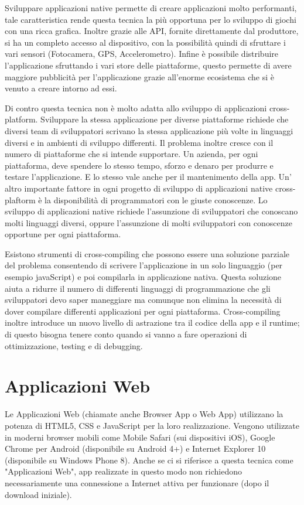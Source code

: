 Sviluppare applicazioni native permette di creare applicazioni molto performanti, tale caratteristica rende questa tecnica la più opportuna per lo sviluppo di giochi con una ricca grafica. Inoltre grazie alle API, fornite direttamente dal produttore, si ha un completo accesso al dispositivo, con la possibilità quindi di sfruttare i vari sensori (Fotocamera, GPS, Accelerometro). Infine è possibile distribuire l'applicazione sfruttando i vari store delle piattaforme, questo permette di avere maggiore pubblicità per l'applicazione grazie all'enorme ecosistema che si è venuto a creare intorno ad essi.

Di contro questa tecnica non è molto adatta allo sviluppo di applicazioni cross-platform. Sviluppare la stessa applicazione per diverse piattaforme richiede che diversi team di sviluppatori scrivano la stessa applicazione più volte in linguaggi diversi e in ambienti di sviluppo differenti.
Il problema inoltre cresce con il numero di piattaforme che si intende supportare. Un azienda, per ogni piattaforma, deve spendere lo stesso tempo, sforzo e denaro per produrre e testare l'applicazione. E lo stesso vale anche per il mantenimento della app.
Un' altro importante fattore in ogni progetto di sviluppo di applicazioni native cross-plaftorm è la disponibilità di programmatori con le giuste conoscenze. Lo sviluppo di applicazioni native richiede l'assunzione di sviluppatori che conoscano molti linguaggi diversi, oppure l'assunzione di molti sviluppatori con conoscenze opportune per ogni piattaforma.
 
Esistono strumenti di cross-compiling che possono essere una soluzione parziale del problema consentendo di scrivere l'applicazione in un solo linguaggio (per esempio javaScript) e poi compilarla in applicazione nativa. Questa soluzione aiuta a ridurre il numero di differenti linguaggi di programmazione che gli sviluppatori devo saper maneggiare ma comunque non elimina la necessità di dover compilare differenti applicazioni per ogni piattaforma. Cross-compiling inoltre introduce un nuovo livello di astrazione tra il codice della app e il runtime; di questo bisogna tenere conto quando si vanno a fare operazioni di ottimizzazione, testing e di debugging.

	\section{Applicazioni Web}
		Le Applicazioni Web (chiamate anche Browser App o Web App) utilizzano la potenza di HTML5, CSS e JavaScript per la loro realizzazione. Vengono utilizzate in moderni browser mobili come Mobile Safari (sui dispositivi iOS), Google Chrome per Android (disponibile su Android 4+) e Internet Explorer 10 (disponibile su Windows Phone 8).
Anche se ci si riferisce a questa tecnica come "Applicazioni Web", app realizzate in questo modo non richiedono necessariamente una connessione a Internet attiva per funzionare (dopo il download iniziale). 

